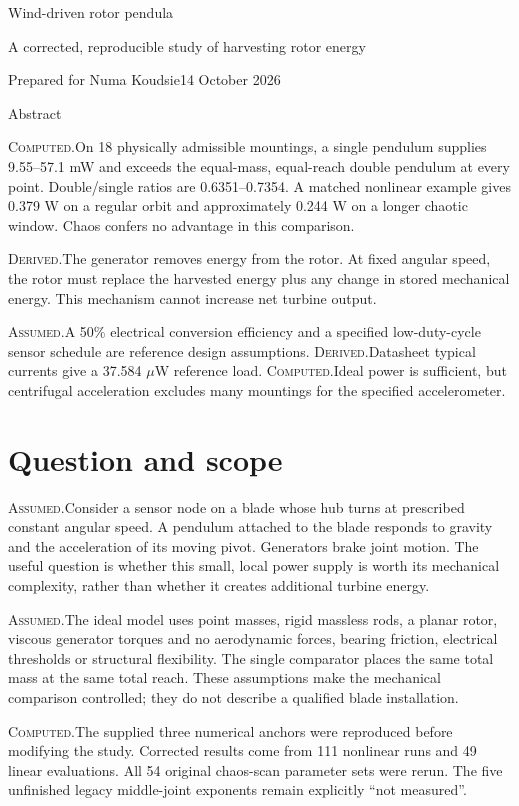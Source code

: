 \documentclass[10pt,a4paper]{article}
\newcommand{\D}{\textcolor{accent}{\textsc{Derived.}}\enspace}
\newcommand{\C}{\textcolor{accent}{\textsc{Computed.}}\enspace}
\newcommand{\A}{\textcolor{accent}{\textsc{Assumed.}}\enspace}
\begin{document}
{\sectionface\color{accent}\fontsize{33}{35}\selectfont Wind-driven rotor pendula}\par
{\large A corrected, reproducible study of harvesting rotor energy}\par
Prepared for Numa Koudsie\hfill 14 October 2026
\begin{tcolorbox}[enhanced,frame hidden,colback=white,boxrule=0pt,borderline west={4pt}{0pt}{accent},left=10pt,right=5pt,top=5pt,bottom=5pt]
\sectionface\large Abstract\par\normalfont
\C On 18 physically admissible mountings, a single pendulum supplies 9.55--57.1 mW and exceeds the equal-mass, equal-reach double pendulum at every point. Double/single ratios are 0.6351--0.7354. A matched nonlinear example gives 0.379 W on a regular orbit and approximately 0.244 W on a longer chaotic window. Chaos confers no advantage in this comparison.

\D The generator removes energy from the rotor. At fixed angular speed, the rotor must replace the harvested energy plus any change in stored mechanical energy. This mechanism cannot increase net turbine output.

\A A 50\% electrical conversion efficiency and a specified low-duty-cycle sensor schedule are reference design assumptions. \D Datasheet typical currents give a 37.584 $\mu$W reference load. \C Ideal power is sufficient, but centrifugal acceleration excludes many mountings for the specified accelerometer.
\end{tcolorbox}
\section*{Question and scope}
\A Consider a sensor node on a blade whose hub turns at prescribed constant angular speed. A pendulum attached to the blade responds to gravity and the acceleration of its moving pivot. Generators brake joint motion. The useful question is whether this small, local power supply is worth its mechanical complexity, rather than whether it creates additional turbine energy.

\A The ideal model uses point masses, rigid massless rods, a planar rotor, viscous generator torques and no aerodynamic forces, bearing friction, electrical thresholds or structural flexibility. The single comparator places the same total mass at the same total reach. These assumptions make the mechanical comparison controlled; they do not describe a qualified blade installation.

\C The supplied three numerical anchors were reproduced before modifying the study. Corrected results come from 111 nonlinear runs and 49 linear evaluations. All 54 original chaos-scan parameter sets were rerun. The five unfinished legacy middle-joint exponents remain explicitly ``not measured''.
\end{document}
